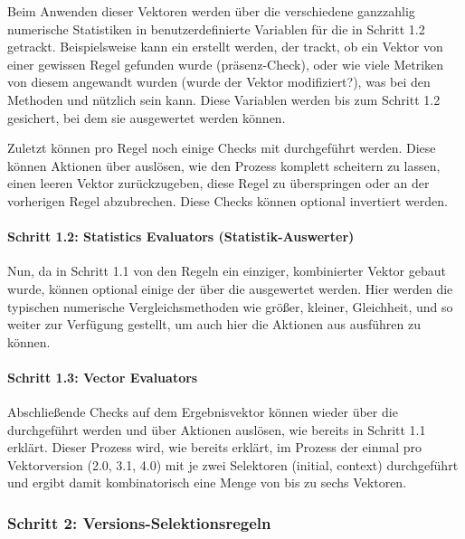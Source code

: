 Beim Anwenden dieser Vektoren werden über die  verschiedene ganzzahlig numerische Statistiken in benutzerdefinierte Variablen für die  in Schritt 1.2 getrackt.
Beispielsweise kann ein  erstellt werden, der trackt, ob ein Vektor von einer gewissen Regel gefunden wurde (präsenz-Check), oder wie viele Metriken von diesem angewandt wurden (wurde der Vektor modifiziert?), was bei den Methoden  und  nützlich sein kann.
Diese Variablen werden bis zum Schritt 1.2 gesichert, bei dem sie ausgewertet werden können.

Zuletzt können pro Regel noch einige Checks mit  durchgeführt werden.
Diese können Aktionen über  auslösen, wie den Prozess komplett scheitern zu lassen, einen leeren Vektor zurückzugeben, diese Regel zu überspringen oder an der vorherigen Regel abzubrechen.
Diese Checks können optional invertiert werden.

\paragraph{Schritt 1.2: Statistics Evaluators (Statistik-Auswerter)}

Nun, da in Schritt 1.1 von den Regeln ein einziger, kombinierter Vektor gebaut wurde, können optional einige der  über die  ausgewertet werden.
Hier werden die typischen numerische Vergleichsmethoden wie größer, kleiner, Gleichheit, und so weiter zur Verfügung gestellt, um auch hier die Aktionen aus  ausführen zu können.

\paragraph{Schritt 1.3: Vector Evaluators}

Abschließende Checks auf dem Ergebnisvektor können wieder über die  durchgeführt werden und über  Aktionen auslösen, wie bereits in Schritt 1.1 erklärt.
Dieser Prozess wird, wie bereits erklärt, im Prozess der {\metaeffekt} einmal pro Vektorversion (2.0, 3.1, 4.0) mit je zwei Selektoren (initial, context) durchgeführt und ergibt damit kombinatorisch eine Menge von bis zu sechs Vektoren.

\subsubsection{Schritt 2: Versions-Selektionsregeln} \label{subsubsec:projektbericht-loesungsweg-cvss-selection-rules-2}

